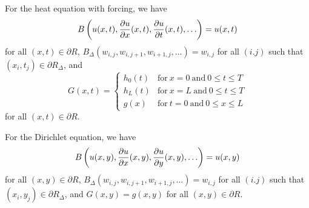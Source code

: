 \begin{egg}
For the heat equation with forcing, we have
\[
B\left(u(x,t), \displaystyle \frac{\partial{u}}{\partial{x}}(x,t), \displaystyle
  \frac{\partial{u}}{\partial{t}}(x,t),\ldots \right) = u(x,t)
\]
for all $(x,t) \in \partial R$,
$B_\Delta(w_{i,j},w_{i,j+1},w_{i+1,j}, \ldots) = w_{i,j}$
for all $(i.j)$ such that $(x_i,t_j) \in \partial R_\Delta$, and
\[
G(x,t) =
\begin{cases}
h_0(t) & \text{for} \ x =0 \ \text{and} \ 0 \leq t \leq T\\
h_L(t) & \text{for} \ x = L \ \text{and} \ 0 \leq t \leq T\\
g(x) & \text{for} \ t =0 \ \text{and}\ 0 \leq x \leq L
\end{cases}
\]
for all $(x,t) \in \partial R$.

For the Dirichlet equation, we have
\[
B\left(u(x,y), \displaystyle \frac{\partial{u}}{\partial{x}}(x,y), \displaystyle
  \frac{\partial{u}}{\partial{y}}(x,y),\ldots \right) = u(x,y)
\]
for all $(x,y) \in \partial R$,
$B_\Delta(w_{i,j},w_{i,j+1},w_{i+1,j}, \ldots) = w_{i,j}$
for all $(i.j)$ such that $(x_i,y_j) \in \partial R_\Delta$, and
$G(x,y) = g(x,y)$ for all $(x,y) \in \partial R$.


\end{egg}
